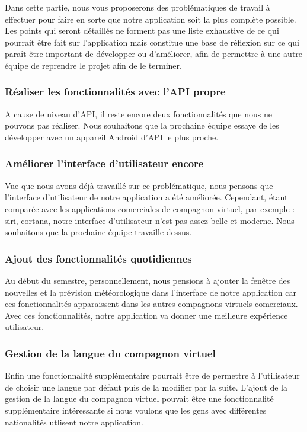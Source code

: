 \indent Dans cette partie, nous vous proposerons des problématiques de travail à effectuer pour faire en sorte que notre application soit la plus complète possible. Les points qui seront détaillés ne forment pas une liste exhaustive de ce qui pourrait être fait sur l'application mais constitue une base de réflexion sur ce qui paraît être important de développer ou d'améliorer, afin de permettre à une autre équipe de reprendre le projet afin de le terminer.

\subsubsection{Réaliser les fonctionnalités avec l'API propre}

\indent A cause de niveau d'API, il reste encore deux fonctionnalités que nous ne pouvons pas réaliser. Nous souhaitons que la prochaine équipe essaye de les développer avec un appareil Android d'API le plus proche.

\subsubsection{Améliorer l'interface d'utilisateur encore}

\indent Vue que nous avons déjà travaillé sur ce problématique, nous pensons que l'interface d'utilisateur de notre application a été améliorée. Cependant, étant comparée avec les applications comerciales de compagnon virtuel, par exemple : siri, cortana, notre interface d'utilisateur n'est pas assez belle et moderne. Nous souhaitons que la prochaine équipe travaille dessus.

\subsubsection{Ajout des fonctionnalités quotidiennes}

\indent Au début du semestre, personnellement, nous pensions à ajouter la fenêtre des nouvelles et la prévision météorologique dans l'interface de notre application car ces fonctionnalités apparaissent dans les autres compagnons virtuels comerciaux. Avec ces fonctionnalités, notre application va donner une meilleure expérience utilisateur.

\subsubsection{Gestion de la langue du compagnon virtuel}

\indent Enfin une fonctionnalité supplémentaire pourrait être de permettre à l'utilisateur de choisir une langue par défaut puis de la modifier par la suite. L'ajout de la gestion de la langue du compagnon virtuel pouvait être une fonctionnalité supplémentaire intéressante si nous voulons que les gens avec différentes nationalités utlisent notre application.
\newpage
